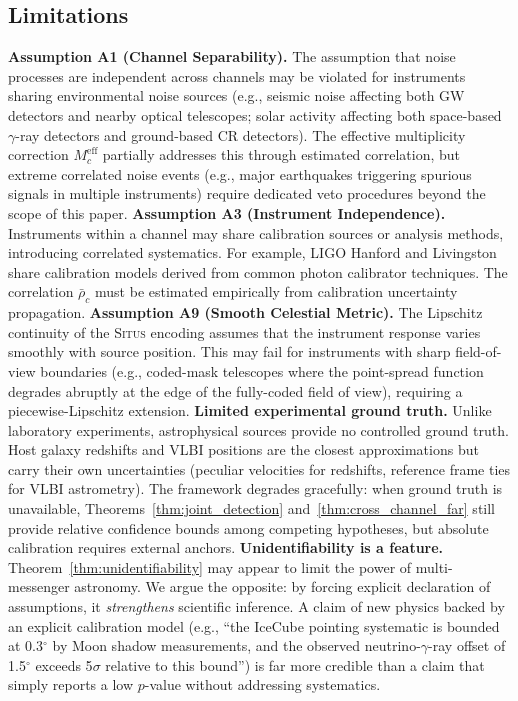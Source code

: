 \documentclass[11pt,a4paper]{article}
\theoremstyle{definition}
\newcommand{\Situs}{\textsc{Situs}}
\begin{document}
\subsection{Limitations}
\textbf{Assumption A1 (Channel Separability).} The assumption that noise processes are independent across channels may be violated for instruments sharing environmental noise sources (e.g., seismic noise affecting both GW detectors and nearby optical telescopes; solar activity affecting both space-based $\gamma$-ray detectors and ground-based CR detectors). The effective multiplicity correction $M_c^{\mathrm{eff}}$ partially addresses this through estimated correlation, but extreme correlated noise events (e.g., major earthquakes triggering spurious signals in multiple instruments) require dedicated veto procedures beyond the scope of this paper.
\textbf{Assumption A3 (Instrument Independence).} Instruments within a channel may share calibration sources or analysis methods, introducing correlated systematics. For example, LIGO Hanford and Livingston share calibration models derived from common photon calibrator techniques. The correlation $\bar{\rho}_c$ must be estimated empirically from calibration uncertainty propagation.
\textbf{Assumption A9 (Smooth Celestial Metric).} The Lipschitz continuity of the \Situs{} encoding assumes that the instrument response varies smoothly with source position. This may fail for instruments with sharp field-of-view boundaries (e.g., coded-mask telescopes where the point-spread function degrades abruptly at the edge of the fully-coded field of view), requiring a piecewise-Lipschitz extension.
\textbf{Limited experimental ground truth.} Unlike laboratory experiments, astrophysical sources provide no controlled ground truth. Host galaxy redshifts and VLBI positions are the closest approximations but carry their own uncertainties (peculiar velocities for redshifts, reference frame ties for VLBI astrometry). The framework degrades gracefully: when ground truth is unavailable, Theorems~\ref{thm:joint_detection} and~\ref{thm:cross_channel_far} still provide relative confidence bounds among competing hypotheses, but absolute calibration requires external anchors.
\textbf{Unidentifiability is a feature.} Theorem~\ref{thm:unidentifiability} may appear to limit the power of multi-messenger astronomy. We argue the opposite: by forcing explicit declaration of assumptions, it \textit{strengthens} scientific inference. A claim of new physics backed by an explicit calibration model (e.g., ``the IceCube pointing systematic is bounded at 0.3$^\circ$ by Moon shadow measurements, and the observed neutrino-$\gamma$-ray offset of 1.5$^\circ$ exceeds 5$\sigma$ relative to this bound'') is far more credible than a claim that simply reports a low $p$-value without addressing systematics.
\end{document}

